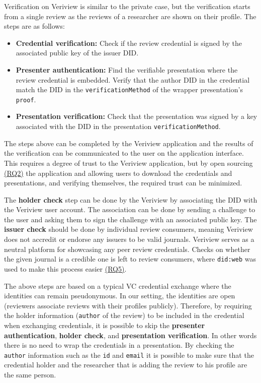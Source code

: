 Verification on Veriview is similar to the private case, but the verification starts from a single review as the reviews of a researcher are shown on their profile. The steps are as follows:

\begin{itemize}

    \item \textbf{Credential verification:} Check if the review credential is signed by the associated public key of the issuer \acrshort{DID}.
    
    \item \textbf{Presenter authentication:} Find the verifiable presentation where the review credential is embedded. Verify that the author \acrshort{DID} in the credential match the \acrshort{DID} in the \lstinline{verificationMethod} of the wrapper presentation's \lstinline{proof}.
    
    \item \textbf{Presentation verification:} Check that the presentation was signed by a key associated with the \acrshort{DID} in the presentation \lstinline{verificationMethod}.

\end{itemize}

The steps above can be completed by the Veriview application and the results of the verification can be communicated to the user on the application interface. This requires a degree of trust to the Veriview application, but by open sourcing \hyperref[rq:transparent]{(RQ2)} the application and allowing users to download the credentials and presentations, and verifying themselves, the required trust can be minimized. 

The \textbf{holder check} step can be done by the Veriview by associating the \acrshort{DID} with the Veriview user account. The association can be done by sending a challenge to the user and asking them to sign the challenge with an associated public key. The \textbf{issuer check} should be done by individual review consumers, meaning Veriview does not accredit or endorse any issuers to be valid journals. Veriview serves as a neutral platform for showcasing any peer review credentials. Checks on whether the given journal is a credible one is left to review consumers, where \lstinline{did:web} was used to make this process easier \hyperref[rq:direct-trust]{(RQ5)}.

The above steps are based on a typical \acrlong{VC} credential exchange where the identities can remain pseudonymous. In our setting, the identities are open (reviewers associate reviews with their profiles publicly). Therefore, by requiring the holder information (\lstinline{author} of the review) to be included in the credential when exchanging credentials, it is possible to skip the \textbf{presenter authentication}, \textbf{holder check}, and \textbf{presentation verification}. In other words there is no need to wrap the credentials in a presentation. By checking the \lstinline{author} information such as the \lstinline{id} and \lstinline{email} it is possible to make sure that the credential holder and the researcher that is adding the review to his profile are the same person.

